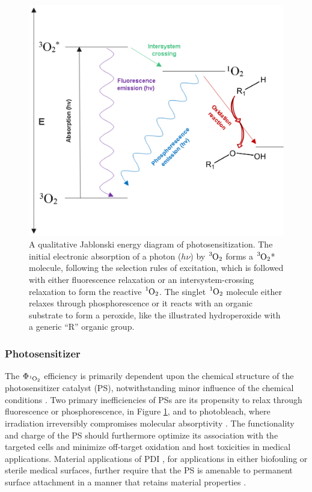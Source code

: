 \begin{figure}[t]
    \centering
    \includegraphics[width = \textwidth]{images/PDIpy/background/jablonski_diagram.png}
    \caption{
        A qualitative Jablonski energy diagram of photosensitization. The initial electronic absorption of a photon ($h\nu$) by $\ce{^3O2}$ forms a $\ce{^3O2}$* molecule, following the selection rules of excitation, which is followed with either fluorescence relaxation or an intersystem-crossing relaxation to form the reactive $\ce{^1O2}$. The singlet $\ce{^1O2}$ molecule either relaxes through phosphorescence or it reacts with an organic substrate to form a peroxide, like the illustrated hydroperoxide with a generic “R” organic group. 
    }
    \label{jablonski_diagram}
\end{figure}

\subsubsection{Photosensitizer}
The $\Phi_{\ce{^1O2}}$ efficiency is primarily dependent upon the chemical structure of the photosensitizer catalyst (PS), notwithstanding minor influence of the chemical conditions \cite{Kruk1998PhotophysicsLuminescence,Kullmann2012UltrafastBisporphyrin}. Two primary inefficiencies of PSs are its propensity to relax through fluorescence or phosphorescence, in Figure \ref{jablonski_diagram}, and to photobleach, where irradiation irreversibly compromises molecular absorptivity \cite{Bonnett2010ChemInformTherapy,Wasser1973TheMetallochlorins}. The functionality and charge of the PS should furthermore optimize its association with the targeted cells \cite{VanDerWal1997DeterminationBacteria,Dickson1989CellSurfaces} and minimize off-target oxidation \cite{Lambrechts2005PhotodynamicMice} and host toxicities \cite{Quishida2016PhotodynamicLight} in medical applications. Material applications of PDI \cite{Peddinti2018PhotodynamicThreat,Gottenbos2001AntimicrobialBacteria}, for applications in either biofouling or sterile medical surfaces, further require that the PS is amenable to permanent surface attachment in a manner that retains material properties \cite{McCoy2014PhotodynamicControl}. 

